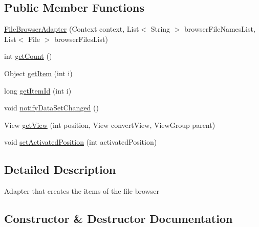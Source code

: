 \subsection*{Public Member Functions}
\begin{DoxyCompactItemize}
\item 
\hyperlink{classandroid_1_1app_1_1printerapp_1_1viewer_1_1_file_browser_adapter_a5bd01b7904f54c01752a47d805808f5b}{File\+Browser\+Adapter} (Context context, List$<$ String $>$ browser\+File\+Names\+List, List$<$ File $>$ browser\+Files\+List)
\item 
int \hyperlink{classandroid_1_1app_1_1printerapp_1_1viewer_1_1_file_browser_adapter_ad77f7aa745488f22970168d39d766694}{get\+Count} ()
\item 
Object \hyperlink{classandroid_1_1app_1_1printerapp_1_1viewer_1_1_file_browser_adapter_a2f6dfd9a276721bc459ddac9bfd695d3}{get\+Item} (int i)
\item 
long \hyperlink{classandroid_1_1app_1_1printerapp_1_1viewer_1_1_file_browser_adapter_ac4950f5a1172331a5e0845f2845ab202}{get\+Item\+Id} (int i)
\item 
void \hyperlink{classandroid_1_1app_1_1printerapp_1_1viewer_1_1_file_browser_adapter_a6cccb033d3116d3cbc0cc1bbb7690f94}{notify\+Data\+Set\+Changed} ()
\item 
View \hyperlink{classandroid_1_1app_1_1printerapp_1_1viewer_1_1_file_browser_adapter_a3d71723488ca4223a6e0e8ebb02f1766}{get\+View} (int position, View convert\+View, View\+Group parent)
\item 
void \hyperlink{classandroid_1_1app_1_1printerapp_1_1viewer_1_1_file_browser_adapter_a93b85b4d48e4a0a7521fab0934f6dac7}{set\+Activated\+Position} (int activated\+Position)
\end{DoxyCompactItemize}


\subsection{Detailed Description}
Adapter that creates the items of the file browser 

\subsection{Constructor \& Destructor Documentation}
\mbox{\label{classandroid_1_1app_1_1printerapp_1_1viewer_1_1_file_browser_adapter_a5bd01b7904f54c01752a47d805808f5b}} 
